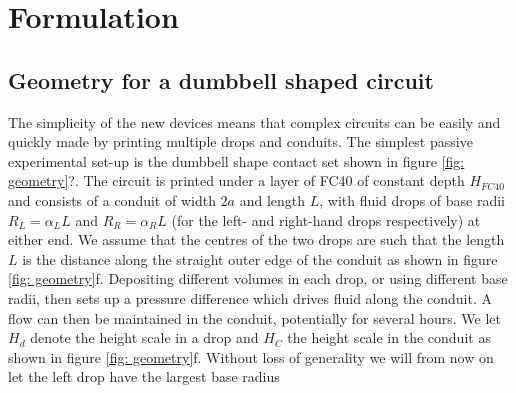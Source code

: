 \documentclass{jfm}
\begin{document}
\section{Formulation} \label{sec: formulation}




\subsection{Geometry for a dumbbell shaped circuit}

The simplicity of the new devices means that complex circuits  can be easily and quickly  made by printing multiple  drops and conduits. 
The simplest passive  experimental set-up  is the dumbbell shape contact set shown in figure \ref{fig: geometry}?.  
The circuit is printed under a layer of FC40 of constant  depth $H_{FC40}$ and  consists of a    conduit  of width $2a$ and length $L$, with   fluid drops  of  base radii $R_L=\alpha_L L$ and $R_R=\alpha_R L$  (for the left- and right-hand drops respectively)   at either end.
We assume that the centres of the two drops are such that the length $L$ is the distance along the straight outer edge of the conduit as shown in figure \ref{fig: geometry}f.
Depositing different volumes in each drop,  or using different base radii, then sets up a pressure difference which drives fluid along the conduit.
A flow can then be maintained in the conduit, potentially  for several hours.
We let $H_d$ denote the height scale in a drop and $H_C$ the height scale in the conduit as shown in  figure \ref{fig: geometry}f.
Without loss of generality we will from now on let the left drop have the largest base radius 
\end{document}
